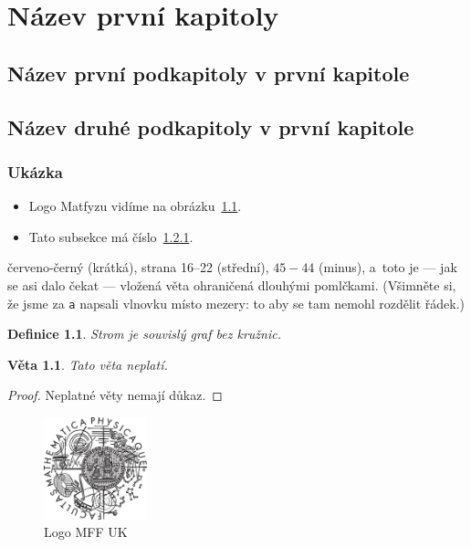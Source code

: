 \chapter{Název první kapitoly}

\section{Název první podkapitoly v první kapitole}

\section{Název druhé podkapitoly v první kapitole}

\subsection{Ukázka}
\label{ssec:ukazka}

\begin{itemize}
\item Logo Matfyzu vidíme na obrázku~\ref{fig:mff}.
\item Tato subsekce má číslo~\ref{ssec:ukazka}.
\end{itemize}

červeno-černý (krátká),
strana 16--22 (střední),
$45-44$ (minus),
a~toto je --- jak se asi dalo čekat --- vložená věta ohraničená dlouhými pomlčkami.
(Všimněte si, že jsme za \verb|a| napsali vlnovku místo mezery: to aby se
tam nemohl rozdělit řádek.)

\newtheorem{theorem}{Věta}
\newtheorem*{define}{Definice}	%

\begin{define}
{\sl Strom} je souvislý graf bez kružnic.
\end{define}

\begin{theorem}
Tato věta neplatí.
\end{theorem}

\begin{proof}
Neplatné věty nemají důkaz.
\end{proof}

\begin{figure}
	\centering
	\includegraphics[width=30mm]{img/logo.eps}
	\caption{Logo MFF UK}
	\label{fig:mff}
\end{figure}

